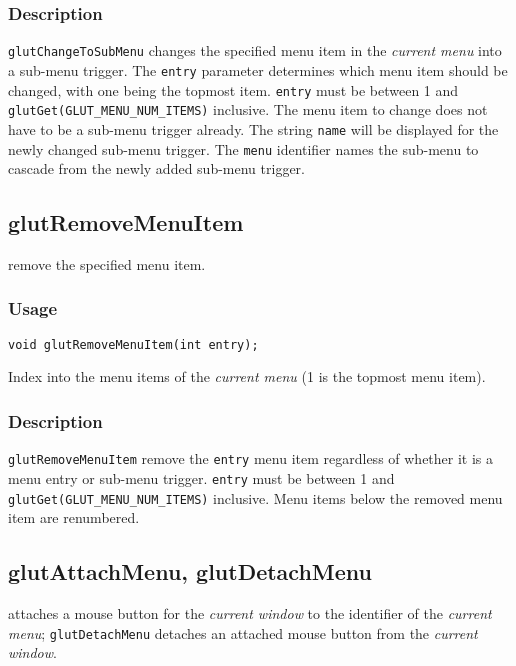 \subsubsection*{Description}

{\tt glutChangeToSubMenu} changes the specified menu item in the {\em
current menu} into a sub-menu trigger.  The {\tt entry} parameter
determines which menu item should be changed, with one being the
topmost item.  
{\tt entry} must be between 1 and {\tt glutGet(GLUT\_MENU\_NUM\_ITEMS)}
inclusive.
The menu item to change does not have to be a sub-menu
trigger already.  The string {\tt name}
will be displayed for the newly changed sub-menu trigger.
The {\tt menu} identifier names the sub-menu to cascade from the
newly added sub-menu trigger.

\subsection{glutRemoveMenuItem}

 remove the specified menu item.

\subsubsection*{Usage}
\begin{verbatim}
void glutRemoveMenuItem(int entry);
\end{verbatim}
\begin{description}
\itemsep 0in
\item[\tt entry]
Index into the menu items of the {\em current menu} (1 is the topmost
menu item).
\end{description}

\subsubsection*{Description}

{\tt glutRemoveMenuItem} remove the {\tt entry} menu item regardless of whether it
is a menu entry or sub-menu trigger.
{\tt entry} must be between 1 and {\tt glutGet(GLUT\_MENU\_NUM\_ITEMS)}
inclusive.
Menu items below the removed menu item are renumbered.

\subsection{glutAttachMenu, glutDetachMenu}

 attaches a mouse button for the {\em current window} to the identifier of
the {\em current menu}; {\tt glutDetachMenu} detaches an attached mouse button from the
{\em current window}.

